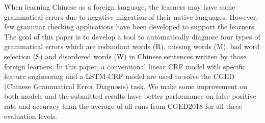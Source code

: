 When learning Chinese as a foreign language, the learners may have some grammatical errors due to negative migration of their native languages. However, few grammar checking applications have been developed to support the learners. The goal of this paper is to develop a tool to automatically diagnose four types of grammatical errors which are redundant words (R), missing words (M), bad word selection (S) and disordered words (W) in Chinese sentences written by those foreign learners. In this paper, a conventional linear CRF model with specific feature engineering and a LSTM-CRF model are used to solve the CGED (Chinese Grammatical Error Diagnosis) task. We make some improvement on both models and the submitted results have better performance on false positive rate and accuracy than the average of all runs from CGED2018 for all three evaluation levels.

